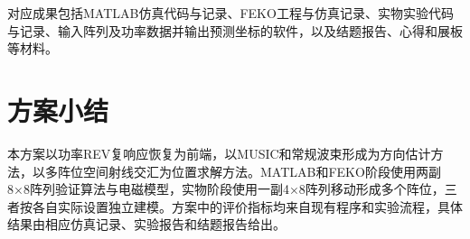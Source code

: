 \documentclass[UTF8,a4paper,12pt]{ctexart}
\begin{document}
对应成果包括MATLAB仿真代码与记录、FEKO工程与仿真记录、实物实验代码与记录、输入阵列及功率数据并输出预测坐标的软件，以及结题报告、心得和展板等材料。

\section{方案小结}

本方案以功率REV复响应恢复为前端，以MUSIC和常规波束形成为方向估计方法，以多阵位空间射线交汇为位置求解方法。MATLAB和FEKO阶段使用两副8×8阵列验证算法与电磁模型，实物阶段使用一副4×8阵列移动形成多个阵位，三者按各自实际设置独立建模。方案中的评价指标均来自现有程序和实验流程，具体结果由相应仿真记录、实验报告和结题报告给出。
\end{document}

